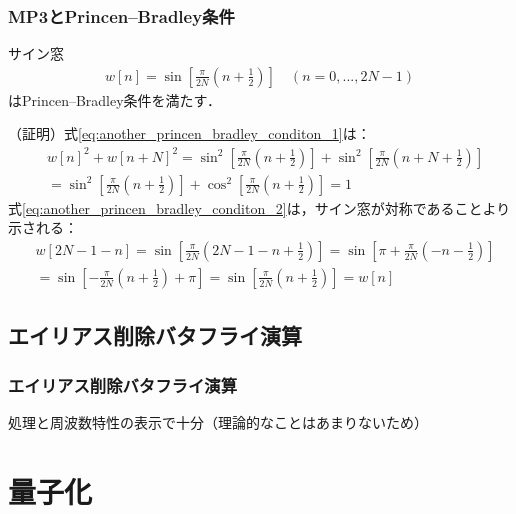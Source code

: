 \documentclass[14pt,xcolor=dvipsnames,table,dvipdfmx]{beamer}
\begin{document}
\begin{frame}[c]
    \frametitle{MP3とPrincen--Bradley条件}
    \begin{block}{}
        サイン窓
        \begin{align}
            w[n] = \sin \left[ \frac{\pi}{2N} \left( n + \frac{1}{2} \right) \right] \quad (n = 0, ..., 2N - 1)
        \end{align}
        はPrincen--Bradley条件を満たす．
    \end{block}
    \scriptsize
    （証明）式\eqref{eq:another_princen_bradley_conditon_1}は：
    \begin{align*}
        &w[n]^{2} + w[n + N]^{2} = \sin^{2} \left[ \frac{\pi}{2N} \left( n + \frac{1}{2} \right) \right] + \sin^{2} \left[ \frac{\pi}{2N} \left( n + N + \frac{1}{2} \right) \right] \\
        &= \sin^{2} \left[ \frac{\pi}{2N} \left( n + \frac{1}{2} \right) \right] + \cos^{2} \left[ \frac{\pi}{2N} \left( n + \frac{1}{2} \right) \right] = 1
    \end{align*}
    式\eqref{eq:another_princen_bradley_conditon_2}は，サイン窓が対称であることより示される：
    \begin{align*}
        & w[2N - 1 - n] = \sin\left[ \frac{\pi}{2N} \left( 2N - 1 - n + \frac{1}{2} \right) \right] = \sin\left[ \pi + \frac{\pi}{2N} \left( - n - \frac{1}{2} \right) \right] \\
        &= \sin \left[ -\frac{\pi}{2N} \left( n + \frac{1}{2} \right) + \pi \right] = \sin \left[ \frac{\pi}{2N} \left( n + \frac{1}{2} \right) \right] = w[n]
    \end{align*}
\end{frame}

\subsection{エイリアス削除バタフライ演算}

\begin{frame}[c]
    \frametitle{エイリアス削除バタフライ演算}
    処理と周波数特性の表示で十分（理論的なことはあまりないため）
\end{frame}

\section{量子化}
\end{document}
